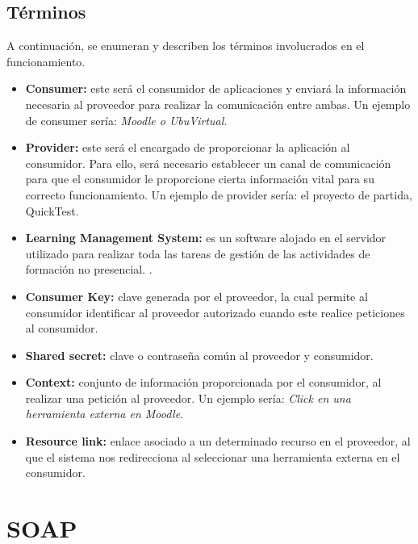 \subsection{Términos}

A continuación, se enumeran y describen los términos involucrados en el funcionamiento.

\begin{itemize}

	\item \textbf{Consumer:} este será el consumidor de aplicaciones y enviará la información necesaria al proveedor para realizar la comunicación entre ambas. Un ejemplo de consumer sería: \emph{Moodle o UbuVirtual.}
	
	\item \textbf{Provider:} este será el encargado de proporcionar la aplicación al consumidor. Para ello, será necesario establecer un canal de comunicación para que el consumidor le proporcione cierta información vital para su correcto funcionamiento. Un ejemplo de provider sería: el proyecto de partida, QuickTest.
	
	\item \textbf{Learning Management System:} es un software alojado en el servidor utilizado para realizar toda las tareas de gestión de las actividades de formación no presencial. \cite{wiki:lms}.
	
	\item \textbf{Consumer Key:} clave generada por el proveedor, la cual permite al consumidor identificar al proveedor autorizado cuando este realice peticiones al consumidor.
	
	\item \textbf{Shared secret:} clave o contraseña común al proveedor y consumidor.
	
	\item \textbf{Context:} conjunto de información proporcionada por el consumidor, al realizar una petición al proveedor. Un ejemplo sería: \emph{Click en una herramienta externa en Moodle}.
	
	\item \textbf{Resource link:} enlace asociado a un determinado recurso en el proveedor, al que el sistema nos redirecciona al seleccionar una herramienta externa en el consumidor.
	
\end{itemize}


\section{SOAP}\label{sec:Soap}


